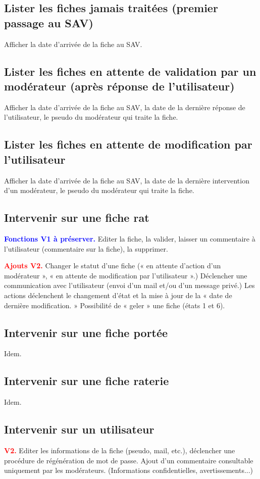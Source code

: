 \documentclass[a4paper,10pt]{article}
\newcommand\existant[1]{\noindent\textbf{\textcolor{blue}{#1}}}
\newcommand\desire[1]{\noindent\textbf{\textcolor{red}{#1}}}
\begin{document}
\subsection{Lister les fiches jamais traitées (premier passage au SAV)}
Afficher la date d'arrivée de la fiche au SAV.

\subsection{Lister les fiches en attente de validation par un modérateur (après réponse de l'utilisateur)}
Afficher la date d'arrivée de la fiche au SAV, la date de la dernière réponse de l'utilisateur, le pseudo du modérateur qui traite la fiche.

\subsection{Lister les fiches en attente de modification par l'utilisateur}
Afficher la date d'arrivée de la fiche au SAV, la date de la dernière intervention d'un modérateur, le pseudo du modérateur qui traite la fiche.

\subsection{Intervenir sur une fiche rat}
\existant{Fonctions V1 à préserver.} Editer la fiche, la valider, laisser un commentaire à l'utilisateur (commentaire sur la fiche), la supprimer.

\desire{Ajouts V2.} Changer le statut d'une fiche (« en attente d'action d'un modérateur », « en attente de modification par l'utilisateur ».) Déclencher une communication avec l'utilisateur (envoi d'un mail et/ou d'un message privé.) Les actions déclenchent le changement d'état et la mise à jour de la « date de dernière modification. »  Possibilité de « geler » une fiche (états 1 et 6).  

\subsection{Intervenir sur une fiche portée}
Idem.

\subsection{Intervenir sur une fiche raterie}
Idem.

\subsection{Intervenir sur un utilisateur}
\desire{V2.} Editer les informations de la fiche (pseudo, mail, etc.), déclencher une procédure de régénération de mot de passe. Ajout d'un commentaire consultable uniquement par les modérateurs. (Informations confidentielles, avertissements...)
\end{document}
